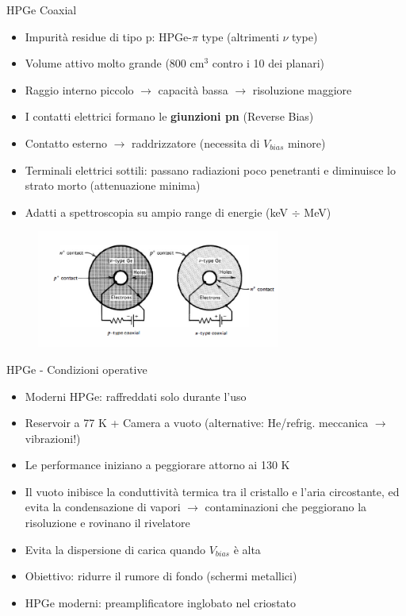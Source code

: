 \documentclass{beamer}
\begin{document}
\begin{frame}{HPGe Coaxial}
\begin{itemize}
    \item Impurità residue di tipo p: HPGe-$\pi$ type (altrimenti $\nu$ type)
    \item Volume attivo molto grande (800 cm$^3$ contro i 10 dei planari)
    \item Raggio interno piccolo $\to$ capacità bassa $\to$ risoluzione maggiore
    \item I contatti elettrici formano le \textbf{giunzioni pn} (Reverse Bias)
    \item Contatto esterno $\to$ raddrizzatore (necessita di $V_{bias}$ minore)
    \item Terminali elettrici sottili: passano radiazioni poco penetranti e diminuisce lo strato morto (attenuazione minima)
    \item Adatti a spettroscopia su ampio range di energie (keV $\div$ MeV)
\end{itemize}
    \begin{figure}
        \centering
        \includegraphics[width=8cm]{images/hpge_coaxial.PNG}
    \end{figure}
\end{frame}

\begin{frame}{HPGe - Condizioni operative}
\begin{itemize}
    \item Moderni HPGe: raffreddati solo durante l'uso
    \item Reservoir a 77 K + Camera a vuoto (alternative: He/refrig. meccanica $\to$ vibrazioni!)
    \item Le performance iniziano a peggiorare attorno ai 130 K
    \item Il vuoto inibisce la conduttività termica tra il cristallo e l'aria circostante, ed evita la condensazione di vapori $\to$ contaminazioni che peggiorano la risoluzione e rovinano il rivelatore
    \item Evita la dispersione di carica quando $V_{bias}$ è alta
    \item Obiettivo: ridurre il rumore di fondo (schermi metallici)
    \item HPGe moderni: preamplificatore inglobato nel criostato
 \end{itemize}
    
\end{frame}
\end{document}
